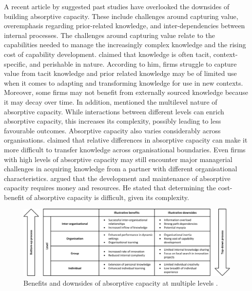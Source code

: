 A recent article by \citet {lichtenthaler2016absorptive} suggested past studies have overlooked the downsides of building absorptive capacity. These include challenges around capturing value, overemphasis regarding prior-related knowledge, and inter-dependencies between internal processes. The challenges around capturing value relate to the capabilities needed to manage the increasingly complex knowledge and the rising cost of capability development. \citet{lichtenthaler2016absorptive} claimed that knowledge is often tacit, context-specific, and perishable in nature. According to him, firms struggle to capture value from tacit knowledge and prior related knowledge may be of limited use when it comes to adapting and transforming knowledge for use in new contexts. Moreover, some firms may not benefit from externally sourced knowledge because it may decay over time. In addition, \citet{lichtenthaler2016absorptive} mentioned the multilevel nature of absorptive capacity. While interactions between different levels can enrich absorptive capacity, this increases its complexity, possibly leading to less favourable outcomes. Absorptive capacity also varies considerably across organisations. \citet{lichtenthaler2016absorptive} claimed that relative differences in absorptive capacity can make it more difficult to transfer knowledge across organisational boundaries. Even firms with high levels of absorptive capacity may still encounter major managerial challenges in acquiring knowledge from a partner with different organisational characteristics. \citet{lichtenthaler2016absorptive} argued that the development and maintenance of absorptive capacity requires money and resources. He stated that determining the cost-benefit of absorptive capacity is difficult, given its complexity. \medskip

\begin{figure}
	\centering
	\includegraphics[width=0.9\linewidth]{Images/updownsides}
	\caption{Benefits and downsides of absorptive capacity at multiple levels \citep{lichtenthaler2016absorptive}.}
	\label{fig:updownsides}
\end{figure}

